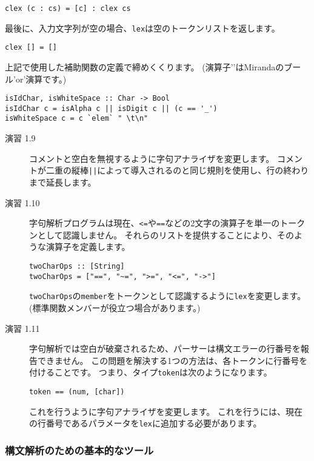 \documentclass{jarticle}
\begin{document}
\begin{verbatim}
clex (c : cs) = [c] : clex cs
\end{verbatim}

最後に、入力文字列が空の場合、\texttt{lex}は空のトークンリストを返します。

\begin{verbatim}
clex [] = []
\end{verbatim}

上記で使用した補助関数の定義で締めくくります。
(演算子'\texttt{\/}'はMirandaのブール'or'演算です。)

\begin{verbatim}
isIdChar, isWhiteSpace :: Char -> Bool
isIdChar c = isAlpha c || isDigit c || (c == '_')
isWhiteSpace c = c `elem` " \t\n"
\end{verbatim}

\begin{description}
	\item[演習 1.9] コメントと空白を無視するように字句アナライザを変更します。
	      コメントが二重の縦棒\texttt{||}によって導入されるのと同じ規則を使用し、行の終わりまで延長します。
	\item[演習 1.10] 字句解析プログラムは現在、\texttt{<=}や\texttt{==}などの2文字の演算子を単一のトークンとして認識しません。
	      それらのリストを提供することにより、そのような演算子を定義します。

	      \begin{verbatim}
twoCharOps :: [String]
twoCharOps = ["==", "~=", ">=", "<=", "->"]
\end{verbatim}

	      \texttt{twoCharOps}の\texttt{member}をトークンとして認識するように\texttt{lex}を変更します。
	      (標準関数メンバーが役立つ場合があります。)
	\item[演習 1.11] 字句解析では空白が破棄されるため、パーサーは構文エラーの行番号を報告できません。
	      この問題を解決する1つの方法は、各トークンに行番号を付けることです。
	      つまり、タイプ\texttt{token}は次のようになります。

	      \begin{verbatim}
token == (num, [char])
\end{verbatim}

	      これを行うように字句アナライザを変更します。
	      これを行うには、現在の行番号であるパラメータを\texttt{lex}に追加する必要があります。
\end{description}

\subsubsection{構文解析のための基本的なツール}
\end{document}
